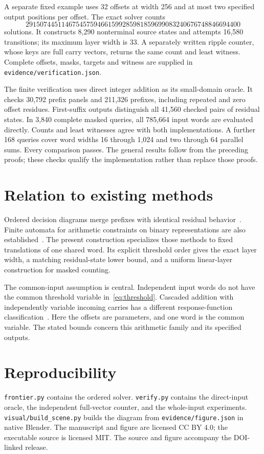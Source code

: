 \documentclass[11pt,a4paper]{article}
\begin{document}
A separate fixed example uses 32 offsets at width 256 and at most two specified
output positions per offset. The exact solver counts
\[
 291507445114675457594661599285981859699083240676748846694400
\]
solutions. It constructs 8,290 nonterminal source states and attempts
16,580 transitions; its maximum layer width is 33.
A separately written ripple counter, whose keys are full carry vectors,
returns the same count and least witness. Complete offsets, masks, targets
and witness are supplied in \texttt{evidence/verification.json}.

The finite verification uses direct integer addition as its small-domain
oracle. It checks 30,792 prefix panels and 211,326 prefixes, including
repeated and zero offset residues. First-suffix outputs distinguish all
41,560 checked pairs of residual states. In 3,840 complete masked queries,
all 785,664 input words are evaluated directly. Counts and least witnesses
agree with both implementations. A further 168 queries cover word widths
16 through 1,024 and two through 64 parallel sums. Every comparison passes.
The general results follow from the preceding proofs; these checks qualify
the implementation rather than replace those proofs.

\section{Relation to existing methods}
Ordered decision diagrams merge prefixes with identical residual
behavior~\cite{bryant}. Finite automata for arithmetic constraints on binary
representations are also established~\cite{wolper}.
The present construction specializes those methods to fixed translations
of one shared word. Its explicit threshold order gives the exact layer
width, a matching residual-state lower bound, and a uniform linear-layer
construction for masked counting.

The common-input assumption is central. Independent input words do not
have the common threshold variable in~\eqref{eq:threshold}.
Cascaded addition with independently variable incoming carries has a
different response-function classification~\cite{cascade}.
Here the offsets are parameters, and one word is the common variable.
The stated bounds concern this arithmetic family and its specified outputs.

\section*{Reproducibility}
\texttt{frontier.py} contains the ordered solver. \texttt{verify.py} contains
the direct-input oracle, the independent full-vector counter, and the
whole-input experiments. \texttt{visual/build\_scene.py} builds the diagram
from \texttt{evidence/figure.json} in native Blender.
The manuscript and figure are licensed CC BY 4.0; the executable source
is licensed MIT. The source and figure accompany the DOI-linked release.
\end{document}
